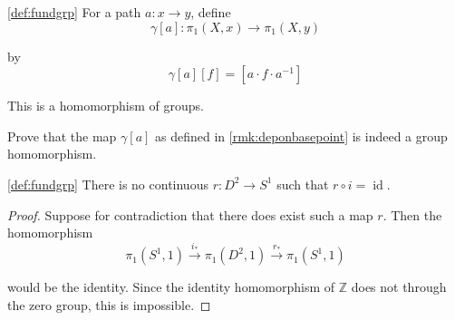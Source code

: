 \begin{remark}
  \label{rmk:deponbasepoint}
  \ref{def:fundgrp}
  For a path $a : x \to y$, define 
  \[
    \gamma[a] : \pi_1(X,x) \to \pi_1(X,y)
  \]

  by 
  \[
    \gamma[a][f] = [a \cdot f \cdot a^{-1}]
  \]

  This is a homomorphism of groups.
\end{remark}


\begin{problem}
  Prove that the map $\gamma[a]$ as defined in \ref{rmk:deponbasepoint} is indeed a group homomorphism.
\end{problem}


\begin{proposition}
  \label{proposition:continuous-d-s1}
  \ref{def:fundgrp}
  There is no continuous $r: D^2 \to S^1$ such that $r \circ i = \operatorname{id}$. 
\end{proposition}

\begin{proof}
Suppose for contradiction that there does exist such a map $r$. Then the homomorphism 
\[
  \pi_1 (S^1, 1)\xrightarrow{i_*} \pi_1(D^2, 1) \xrightarrow{r_*} \pi_1(S^1, 1)
\]

would be the identity. Since the identity homomorphism of $\mathbb{Z}$ does not through the zero group, this is impossible. 
\end{proof}
